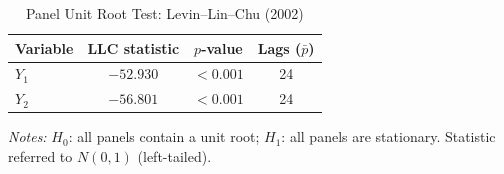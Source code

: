 \documentclass{article}
\begin{document}
\begin{table}[htbp]
\centering
\caption{Panel Unit Root Test: Levin--Lin--Chu (2002)}
\label{tab:r3_unitroot}
\begin{threeparttable}
\begin{tabularx}{\linewidth}{>{\raggedright\arraybackslash}Xccc}
\toprule
Variable & LLC statistic & $p$-value & Lags ($\bar{p}$) \\
\midrule
$Y_1$ & $-52.930$ & $<0.001$ & 24 \\
$Y_2$ & $-56.801$ & $<0.001$ & 24 \\
\bottomrule
\end{tabularx}
\begin{tablenotes}[flushleft]
\footnotesize
\item \textit{Notes:} $H_0$: all panels contain a unit root; $H_1$: all panels are stationary. Statistic referred to $N(0,1)$ (left-tailed).
\end{tablenotes}
\end{threeparttable}
\end{table}
\end{document}
